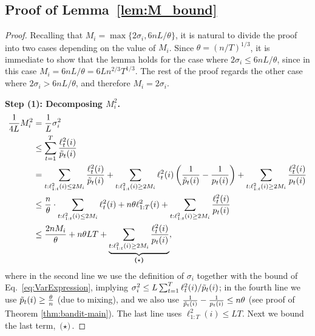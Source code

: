 \subsection{ Proof of Lemma~\ref{lem:M_bound}} \label{subsec:proof-lem-Mbound}
\begin{proof}
Recalling that  $M_i= \max\{ 2\sigma_i,6nL/\theta \}$, it is natural to divide the proof into two cases depending on the value of $M_i$.
Since $\theta =(n/T)^{1/3}$, it is immediate to show that the lemma holds for the case where 
$2\sigma_i\leq {6nL}/{\theta}$, since in this case $M_i = {6nL}/{\theta} = 6Ln^{2/3}T^{1/3}$.
The rest of the proof regards the other case where $2\sigma_i>{6nL}/{\theta}$, and therefore 
$M_i = 2\sigma_i$. 


\textbf{Step (1): Decomposing $M_i^2$.}
\begin{align} \label{eq:BoundSigma_i}
\frac{1}{4L}M_i^2 
&= 
\frac{1}{L}\sigma_i^2  \nonumber\\
&\leq
 \sum_{t=1}^T \frac{\ell_t^2(i)}{\tilde{p}_t(i)}  \nonumber\\
&=
 \sum_{t: \ell_{1:t}^2(i) \leq 2M_i} \frac{\ell_t^2(i)}{\tilde{p}_t(i)}
 +
 \sum_{t: \ell_{1:t}^2(i) \geq 2M_i} \ell_t^2(i)\left( \frac{1}{\tilde{p}_t(i)} -\frac{1}{p_t(i)} \right)
 +
 \sum_{t: \ell_{1:t}^2(i) \geq 2M_i} \frac{ \ell_t^2(i)}{p_t(i)}
   \nonumber\\
    &\leq
\frac{n}{\theta}\cdot  \sum_{t: \ell_{1:t}^2(i) \leq 2M_i} \ell_t^2(i)
 +
  n  \theta \ell_{1:T}^2(i)
 +
\sum_{t: \ell_{1:t}^2(i) \geq 2M_i} \frac{\ell_t^2(i)}{p_t(i)} \nonumber\\
  &\leq
\frac{2n M_i}{\theta}
 +
 n  \theta L T
 +
  \underset{\textbf{($\star$)}}{\underbrace{\sum_{t: \ell_{1:t}^2(i) \geq 2M_i} \frac{\ell_t^2(i)}{p_t(i)}} },
\end{align}
where in the second line we use the definition of $\sigma_i$ together with the bound of Eq.~\eqref{eq:VarExpression}, implying
 $\sigma_i^2 \leq L \sum_{t=1}^T {\ell_t^2(i)}/{\tilde{p}_t(i)}$; in the fourth line we use $\tilde{p}_t(i)\geq \frac{\theta}{n}$ (due to mixing), and we also use
$\frac{1}{\tilde{p}_t(i)} -\frac{1}{p_t(i)} \leq n\theta$ (see proof of Theorem \ref{thm:bandit-main}). The last line uses $\ell_{1:T}^2(i) \leq LT$.
Next we bound the last term, $\textbf{($\star$)}$.


\end{proof}
